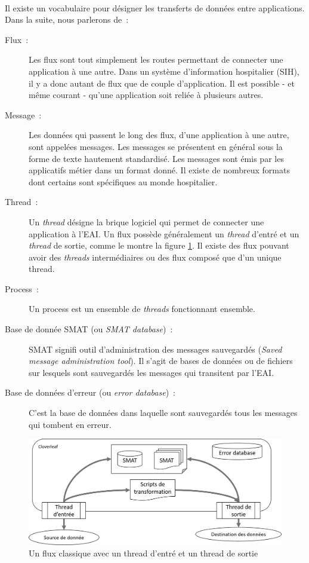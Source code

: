 			\paragraph{}%
 			Il existe un vocabulaire pour désigner les transferts de données entre
 			applications. Dans la suite, nous parlerons de~:
 			\begin{description}
 				\item[Flux~:] Les flux sont tout simplement les routes permettant de
 				connecter une application à une autre. Dans un système d'information hospitalier
 				(SIH), il y a donc autant de flux que de couple d'application. Il est
 				possible - et même courant - qu'une application soit reliée à plusieurs
 				autres.
 				\item[Message~:] Les données qui passent le long des flux, d'une
 				application à une autre, sont appelées messages. Les messages se présentent en général
 				sous la forme de texte hautement standardisé. Les messages sont émis par les
 				applicatifs métier dans un format donné. Il existe de nombreux formats
 				dont certains sont spécifiques au monde hospitalier.
 				\item[Thread~:] Un \textit{thread} désigne la brique logiciel qui permet de
 				connecter une application à l'EAI. Un flux possède généralement un
 				\textit{thread} d'entré et un \textit{thread} de sortie, comme le montre
 				la figure \ref{eai_tech}.
 				Il existe des flux pouvant avoir des \textit{threads} intermédiaires ou des flux composé
 				que d'un unique thread.
 				\item[Process~:] Un process est un ensemble de \textit{threads}
 				fonctionnant ensemble.
 				\item[Base de donnée SMAT (ou \textit{SMAT database})~:] SMAT signifi outil
 				d'administration des messages sauvegardés (\textit{Saved message administration tool}). Il
 				s'agit de bases de données ou de fichiers sur lesquels sont sauvegardés
 				les messages qui transitent par l'EAI.
 				\item[Base de données d'erreur (ou \textit{error database})~:] C'est la
 				base de données dans laquelle sont sauvegardés tous les messages qui
 				tombent en erreur.
 			\end{description}
			\begin{figure}[H]
				\centering
				\includegraphics[width=15cm]{../img/eai_technique.png}
				\caption{\label{eai_tech} Un flux classique avec un thread d'entré et un
				thread de sortie}
			\end{figure}
			
